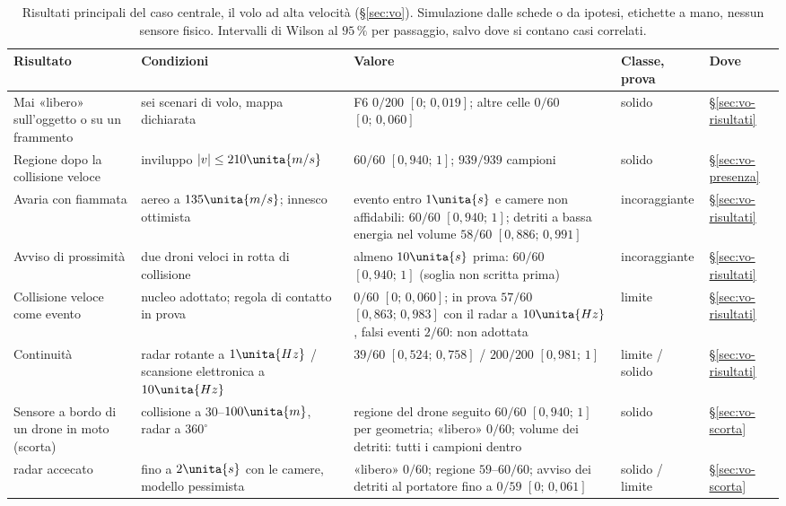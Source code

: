 \begin{table}[!htbp]
\centering\footnotesize
\setlength{\tabcolsep}{4pt}
\caption{Risultati principali del caso centrale, il volo ad alta velocità (\S\ref{sec:vo}). Simulazione dalle schede o da ipotesi, etichette a mano, nessun sensore fisico. Intervalli di Wilson al $95\,\%$ per passaggio, salvo dove si contano casi correlati.}\label{tab:intro-sintesi-volo}
\begin{tabularx}{\textwidth}{@{}>{\RaggedRight\arraybackslash}p{3.1cm}>{\RaggedRight\arraybackslash}p{3.3cm}L>{\RaggedRight\arraybackslash}p{2.0cm}>{\RaggedRight\arraybackslash}p{1.05cm}@{}}
\toprule
Risultato & Condizioni & Valore & Classe, prova & Dove\\
\midrule
Mai «libero» sull'oggetto o su un frammento & sei scenari di volo, mappa dichiarata & F6 $0/200$ $[0;\,0{,}019]$; altre celle $0/60$ $[0;\,0{,}060]$ & solido  & \S\ref{sec:vo-risultati}\\
Regione dopo la collisione veloce & inviluppo $|v|\le210\unita{m/s}$ & $60/60$ $[0{,}940;\,1]$; $939/939$ campioni & solido  & \S\ref{sec:vo-presenza}\\
Avaria con fiammata & aereo a $135\unita{m/s}$; innesco ottimista & evento entro $1\unita{s}$ e camere non affidabili: $60/60$ $[0{,}940;\,1]$; detriti a bassa energia nel volume $58/60$ $[0{,}886;\,0{,}991]$ & incoraggiante  & \S\ref{sec:vo-risultati}\\
Avviso di prossimità & due droni veloci in rotta di collisione & almeno $10\unita{s}$ prima: $60/60$ $[0{,}940;\,1]$ (soglia non scritta prima) & incoraggiante  & \S\ref{sec:vo-risultati}\\
Collisione veloce come evento & nucleo adottato; regola di contatto in prova & $0/60$ $[0;\,0{,}060]$; in prova $57/60$ $[0{,}863;\,0{,}983]$ con il radar a $10\unita{Hz}$, falsi eventi $2/60$: non adottata & limite  & \S\ref{sec:vo-risultati}\\
Continuità & radar rotante a $1\unita{Hz}$ / scansione elettronica a $10\unita{Hz}$ & $39/60$ $[0{,}524;\,0{,}758]$ / $200/200$ $[0{,}981;\,1]$ & limite / solido  & \S\ref{sec:vo-risultati}\\
Sensore a bordo di un drone in moto (scorta) & collisione a $30$--$100\unita{m}$, radar a $360^\circ$ & regione del drone seguito $60/60$ $[0{,}940;\,1]$ per geometria; «libero» $0/60$; volume dei detriti: tutti i campioni dentro & solido  & \S\ref{sec:vo-scorta}\\
\quad radar accecato & fino a $2\unita{s}$ con le camere, modello pessimista & «libero» $0/60$; regione $59$--$60/60$; avviso dei detriti al portatore fino a $0/59$ $[0;\,0{,}061]$ & solido / limite  & \S\ref{sec:vo-scorta}\\

\end{tabularx}
\end{table}
